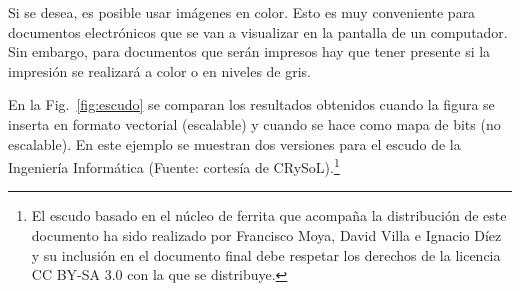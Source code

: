 \documentclass[11pt,a4paper]{article}
\begin{document}
Si se desea, es posible usar imágenes en color. Esto es muy conveniente para documentos electrónicos que se van a visualizar en la pantalla de un computador. Sin embargo, para documentos que serán impresos hay que tener presente si la impresión se realizará a color o en niveles de gris. 

En la Fig.~\ref{fig:escudo} se comparan los resultados obtenidos cuando la figura se inserta en formato vectorial (escalable) y cuando se hace como mapa de bits (no escalable). En este ejemplo se muestran dos versiones para el escudo de la Ingeniería Informática (Fuente: cortesía de CRySoL).\footnote{El escudo basado en el núcleo de ferrita que acompaña la distribución de este documento ha sido realizado por Francisco Moya, David Villa e Ignacio Díez y su inclusión en el documento final debe respetar los derechos de la licencia CC BY-SA 3.0 con la que se distribuye.}
\end{document}
